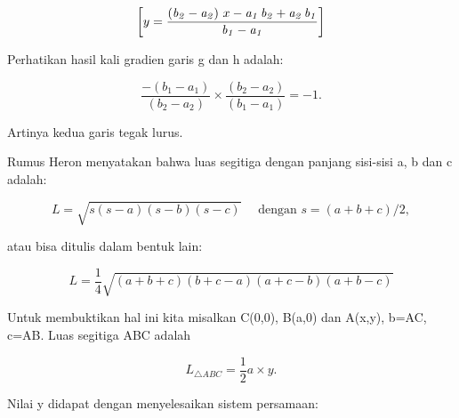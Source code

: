 \documentclass[a4paper,10pt]{article}
\begin{document}
\begin{eulernotebook}
\begin{eulercomment}
\begin{eulercomment}
\begin{eulercomment}
\begin{eulercomment}
\begin{eulerformula}
\[\]
\end{eulerformula}
\begin{eulerformula}
\[
\left[ y=\frac{\left({\it b_2}-{\it a_2}\right)\,x-{\it a_1}\,  {\it b_2}+{\it a_2}\,{\it b_1}}{{\it b_1}-{\it a_1}} \right] 
\]
\end{eulerformula}
\begin{eulercomment}
Perhatikan hasil kali gradien garis g dan h adalah:

\end{eulercomment}
\begin{eulerformula}
\[
\frac{-(b_1-a_1)}{(b_2-a_2)}\times \frac{(b_2-a_2)}{(b_1-a_1)} = -1.
\]
\end{eulerformula}
\begin{eulercomment}
Artinya kedua garis tegak lurus.
\end{eulercomment}
\begin{eulercomment}
Rumus Heron menyatakan bahwa luas segitiga dengan panjang sisi-sisi a,
b dan c adalah:

\end{eulercomment}
\begin{eulerformula}
\[
L = \sqrt{s(s-a)(s-b)(s-c)}\quad \text{ dengan } s=(a+b+c)/2,
\]
\end{eulerformula}
\begin{eulercomment}
atau bisa ditulis dalam bentuk lain:

\end{eulercomment}
\begin{eulerformula}
\[
L = \frac{1}{4}\sqrt{(a+b+c)(b+c-a)(a+c-b)(a+b-c)}
\]
\end{eulerformula}
\begin{eulercomment}
Untuk membuktikan hal ini kita misalkan C(0,0), B(a,0) dan A(x,y),
b=AC, c=AB. Luas segitiga ABC adalah

\end{eulercomment}
\begin{eulerformula}
\[
L_{\triangle ABC}=\frac{1}{2}a\times y.
\]
\end{eulerformula}
\begin{eulercomment}
Nilai y didapat dengan menyelesaikan sistem persamaan:


\end{eulercomment}
\end{eulercomment}
\end{eulercomment}
\end{eulercomment}
\end{eulercomment}
\end{eulernotebook}
\end{document}
